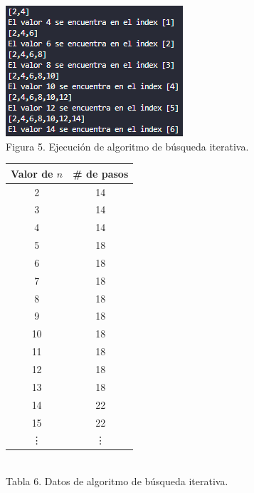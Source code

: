 \documentclass[12pt,twoside]{article}
\begin{document}
\begin{minipage}{.45\linewidth}
  \centering
  \includegraphics[width=1\linewidth]{images/busquedaiterativa.png}
  \\
  Figura 5. Ejecución de algoritmo de búsqueda iterativa.
\end{minipage}\hfill
\begin{minipage}{.45\linewidth}
  \centering
  \begin{tabular}{|c|c|}
    \hline
    \textbf{Valor de $n$} & \textbf{\# de pasos} \\
    \hline
    2  & 14 \\
    3  & 14 \\
    4  & 14 \\
    5  & 18 \\
    6  & 18 \\
    7  & 18 \\
    8  & 18 \\
    9  & 18 \\
    10 & 18 \\
    11 & 18 \\
    12 & 18 \\
    13 & 18 \\
    14 & 22 \\
    15 & 22 \\
    \vdots & \vdots\\
    \hline
  \end{tabular}
  \\
  Tabla 6. Datos de algoritmo de búsqueda iterativa.
\end{minipage}

\medskip
\end{document}

